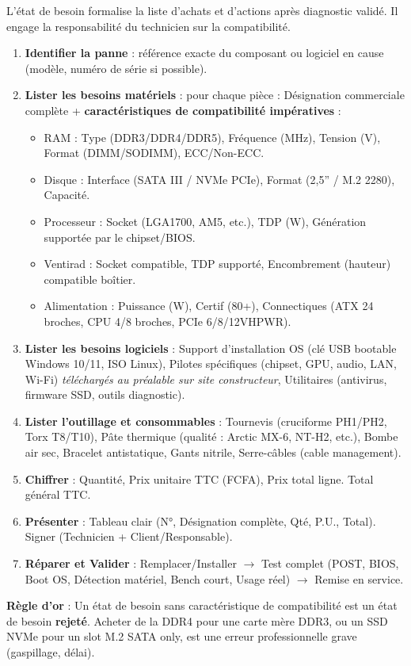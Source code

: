 \documentclass[11pt]{article}
\newcommand{\cle}[1]{{\popxbold\color{popdark}#1}}
\begin{document}
\begin{methode}
L'\cle{état de besoin} formalise la liste d'achats et d'actions après diagnostic validé. Il engage la responsabilité du technicien sur la compatibilité.
\begin{enumerate}
\item \textbf{Identifier la panne} : référence exacte du composant ou logiciel en cause (modèle, numéro de série si possible).
\item \textbf{Lister les besoins matériels} : pour chaque pièce : Désignation commerciale complète + \textbf{caractéristiques de compatibilité impératives} :
    \begin{itemize}
    \item RAM : Type (DDR3/DDR4/DDR5), Fréquence (MHz), Tension (V), Format (DIMM/SODIMM), ECC/Non-ECC.
    \item Disque : Interface (SATA III / NVMe PCIe), Format (2,5'' / M.2 2280), Capacité.
    \item Processeur : Socket (LGA1700, AM5, etc.), TDP (W), Génération supportée par le chipset/BIOS.
    \item Ventirad : Socket compatible, TDP supporté, Encombrement (hauteur) compatible boîtier.
    \item Alimentation : Puissance (W), Certif (80+), Connectiques (ATX 24 broches, CPU 4/8 broches, PCIe 6/8/12VHPWR).
    \end{itemize}
\item \textbf{Lister les besoins logiciels} : Support d'installation OS (clé USB bootable Windows 10/11, ISO Linux), Pilotes spécifiques (chipset, GPU, audio, LAN, Wi-Fi) \emph{téléchargés au préalable sur site constructeur}, Utilitaires (antivirus, firmware SSD, outils diagnostic).
\item \textbf{Lister l'outillage et consommables} : Tournevis (cruciforme PH1/PH2, Torx T8/T10), Pâte thermique (qualité : Arctic MX-6, NT-H2, etc.), Bombe air sec, Bracelet antistatique, Gants nitrile, Serre-câbles (cable management).
\item \textbf{Chiffrer} : Quantité, Prix unitaire TTC (FCFA), Prix total ligne. Total général TTC.
\item \textbf{Présenter} : Tableau clair (N°, Désignation complète, Qté, P.U., Total). Signer (Technicien + Client/Responsable).
\item \textbf{Réparer et Valider} : Remplacer/Installer $\rightarrow$ Test complet (POST, BIOS, Boot OS, Détection matériel, Bench court, Usage réel) $\rightarrow$ Remise en service.
\end{enumerate}
\textbf{Règle d'or} : Un état de besoin sans caractéristique de compatibilité est un état de besoin \textbf{rejeté}. Acheter de la DDR4 pour une carte mère DDR3, ou un SSD NVMe pour un slot M.2 SATA only, est une erreur professionnelle grave (gaspillage, délai).
\end{methode}
\end{document}
